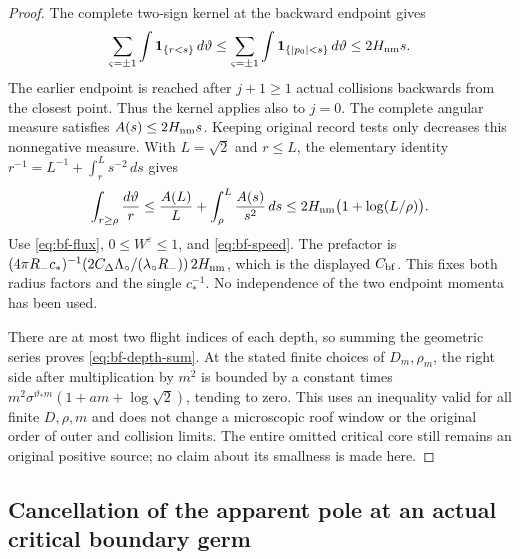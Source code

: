 \begin{proof}
The complete two-sign kernel at the backward endpoint gives
\[
 \sum_{\varsigma=\pm1}\int\mathbf1_{\{r<s\}}\,d\vartheta
 \le\sum_{\varsigma=\pm1}\int\mathbf1_{\{|p_0|<s\}}\,d\vartheta
 \le2H_{\rm nm}s.
\]
The earlier endpoint is reached after $j+1\ge1$ actual collisions
backwards from the closest point.  Thus the kernel applies also to
$j=0$.  The complete angular measure satisfies
$A(s)\le2H_{\rm nm}s$.
Keeping original record tests only decreases this nonnegative measure.
With $L=\sqrt2$ and $r\le L$, the elementary identity
$r^{-1}=L^{-1}+\int_r^L s^{-2}\,ds$ gives
\[
 \int_{r\ge\rho}\frac{d\vartheta}{r}
 \le\frac{A(L)}L+\int_\rho^L\frac{A(s)}{s^2}\,ds
 \le2H_{\rm nm}\bigl(1+\log(L/\rho)\bigr).
\]
Use \eqref{eq:bf-flux}, $0\le W^\varepsilon\le1$, and
\eqref{eq:bf-speed}.  The prefactor is
$(4\pi R_-c_*)^{-1}(2C_\Delta\Lambda_\circ/
(\lambda_\circ R_-))\,2H_{\rm nm}$, which is the displayed
$C_{\rm bf}$.  This fixes both radius factors and the single $c_*^{-1}$.
No independence of the two endpoint momenta has been used.

There are at most two flight indices of each depth, so summing the
geometric series proves \eqref{eq:bf-depth-sum}.  At the stated finite
choices of $D_m,\rho_m$, the right side after multiplication by $m^2$
is bounded by a constant times
$m^2\sigma^{\vartheta_*m}(1+am+\log\sqrt2)$, tending to zero.
This uses an inequality valid for all finite $D,\rho,m$ and does not
change a microscopic roof window or the original order of outer and
collision limits.  The entire omitted critical core still remains an
original positive source; no claim about its smallness is made here.
\end{proof}

\subsection{Cancellation of the apparent pole at an actual critical
boundary germ}

